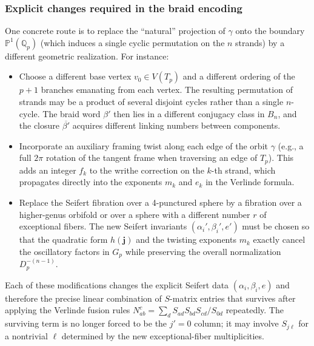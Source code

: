 \subsubsection{Explicit changes required in the braid encoding}
One concrete route is to replace the “natural” projection of \(\gamma\) onto the boundary \(\mathbb{P}^1(\mathbb{Q}_p)\) (which induces a single cyclic permutation on the \(n\) strands) by a different geometric realization. For instance:
\begin{itemize}
\item Choose a different base vertex \(v_0 \in V(T_p)\) and a different ordering of the \(p+1\) branches emanating from each vertex. The resulting permutation of strands may be a product of several disjoint cycles rather than a single \(n\)-cycle. The braid word \(\beta'\) then lies in a different conjugacy class in \(B_n\), and the closure \(\overline{\beta'}\) acquires different linking numbers between components.
\item Incorporate an auxiliary framing twist along each edge of the orbit \(\gamma\) (e.g., a full \(2\pi\) rotation of the tangent frame when traversing an edge of \(T_p\)). This adds an integer \(f_k\) to the writhe correction on the \(k\)-th strand, which propagates directly into the exponents \(m_k\) and \(e_k\) in the Verlinde formula.
\item Replace the Seifert fibration over a 4-punctured sphere by a fibration over a higher-genus orbifold or over a sphere with a different number \(r\) of exceptional fibers. The new Seifert invariants \((\alpha_i',\beta_i',e')\) must be chosen so that the quadratic form \(h(\mathbf{j})\) and the twisting exponents \(m_k\) exactly cancel the oscillatory factors in \(G_p\) while preserving the overall normalization \(D_p^{-(n-1)}\).
\end{itemize}
Each of these modifications changes the explicit Seifert data \((\alpha_i,\beta_i,e)\) and therefore the precise linear combination of \(S\)-matrix entries that survives after applying the Verlinde fusion rules \(N_{ab}^c = \sum_d S_{ad}S_{bd}S_{cd}/S_{0d}\) repeatedly. The surviving term is no longer forced to be the \(j'=0\) column; it may involve \(S_{j\ell}\) for a nontrivial \(\ell\) determined by the new exceptional-fiber multiplicities.

